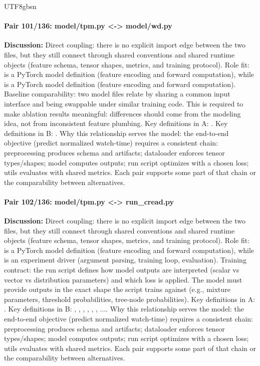\documentclass[11pt]{article}
\begin{document}
\begin{CJK*}{UTF8}{gbsn}
\paragraph{Pair 101/136: model/tpm.py <-> model/wd.py}
\textbf{Discussion:} Direct coupling: there is no explicit import edge between the two files, but they still connect through shared conventions and shared runtime objects (feature schema, tensor shapes, metrics, and training protocol). Role fit: \texttt{} is a PyTorch model definition (feature encoding and forward computation), while \texttt{} is a PyTorch model definition (feature encoding and forward computation). Baseline comparability: two model files relate by sharing a common input interface and being swappable under similar training code. This is required to make ablation results meaningful: differences should come from the modeling idea, not from inconsistent feature plumbing. Key definitions in A: \texttt{}. Key definitions in B: \texttt{}. Why this relationship serves the model: the end-to-end objective (predict normalized watch-time) requires a consistent chain: preprocessing produces schema and artifacts; dataloader enforces tensor types/shapes; model computes outputs; run script optimizes with a chosen loss; utils evaluates with shared metrics. Each pair supports some part of that chain or the comparability between alternatives.

\paragraph{Pair 102/136: model/tpm.py <-> run\_cread.py}
\textbf{Discussion:} Direct coupling: there is no explicit import edge between the two files, but they still connect through shared conventions and shared runtime objects (feature schema, tensor shapes, metrics, and training protocol). Role fit: \texttt{} is a PyTorch model definition (feature encoding and forward computation), while \texttt{} is an experiment driver (argument parsing, training loop, evaluation). Training contract: the run script defines how model outputs are interpreted (scalar vs vector vs distribution parameters) and which loss is applied. The model must provide outputs in the exact shape the script trains against (e.g., mixture parameters, threshold probabilities, tree-node probabilities). Key definitions in A: \texttt{}. Key definitions in B: \texttt{}, \texttt{}, \texttt{}, \texttt{}, \texttt{}, \texttt{}, .... Why this relationship serves the model: the end-to-end objective (predict normalized watch-time) requires a consistent chain: preprocessing produces schema and artifacts; dataloader enforces tensor types/shapes; model computes outputs; run script optimizes with a chosen loss; utils evaluates with shared metrics. Each pair supports some part of that chain or the comparability between alternatives.


\end{CJK*}
\end{document}
